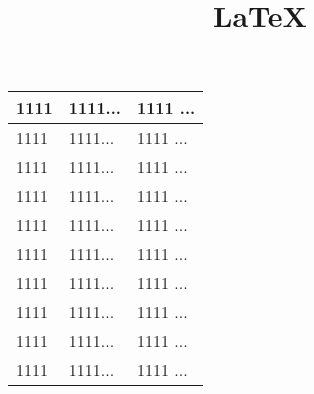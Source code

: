 \documentclass[11pt,a4paper]{article}
\title{LaTeX}    %
\author{}
\date{}
\begin{document}
  \maketitle

\begin{tabular}{|l|l|l|} %
\hline %
1111 & 1111... &1111 ... \\     %
\hline %
1111 & 1111... & 1111 ... \\	%
1111 & 1111... & 1111 ... \\
1111 & 1111... &1111 ... \\
1111 & 1111... &1111 ... \\
1111 & 1111... &1111 ... \\
1111 & 1111... &1111 ... \\
1111 & 1111... &1111 ... \\
1111 & 1111... &1111 ... \\
1111 & 1111... &1111 ... \\
\hline %
\end{tabular}
\end{document}
